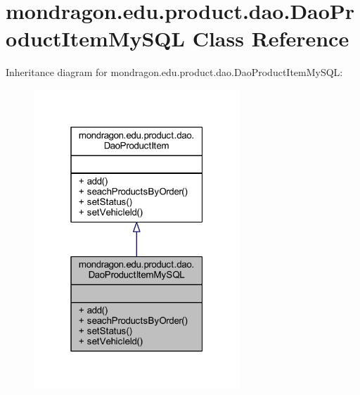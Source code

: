\hypertarget{classmondragon_1_1edu_1_1product_1_1dao_1_1_dao_product_item_my_s_q_l}{}\section{mondragon.\+edu.\+product.\+dao.\+Dao\+Product\+Item\+My\+S\+QL Class Reference}
\label{classmondragon_1_1edu_1_1product_1_1dao_1_1_dao_product_item_my_s_q_l}


Inheritance diagram for mondragon.\+edu.\+product.\+dao.\+Dao\+Product\+Item\+My\+S\+QL\+:\nopagebreak
\begin{figure}[H]
\begin{center}
\leavevmode
\includegraphics[width=220pt]{classmondragon_1_1edu_1_1product_1_1dao_1_1_dao_product_item_my_s_q_l__inherit__graph}
\end{center}
\end{figure}


